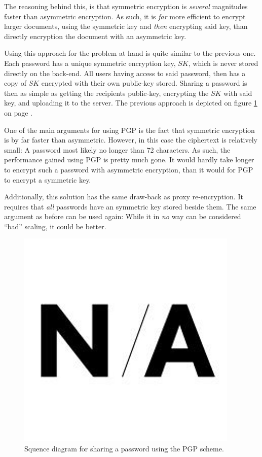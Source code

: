 				The reasoning behind this, is that symmetric encryption is \emph{several} magnitudes faster than asymmetric encryption. As such, it is \emph{far} more efficient to encrypt larger documents, using the symmetric key and \emph{then} encrypting said key, than directly encryption the document with an asymmetric key.

				Using this approach for the problem at hand is quite similar to the previous one. Each password has a unique symmetric encryption key, $SK$, which is never stored directly on the back-end. All users having access to said password, then has a copy of $SK$ encrypted with their own public-key stored. Sharing a password is then as simple as getting the recipients public-key, encrypting the $SK$ with said key, and uploading it to the server. The previous approach is depicted on figure \ref{fig:sequence:pgp} on page \pageref{fig:sequence:pgp}.

				One of the main arguments for using PGP is the fact that symmetric encryption is by far faster than asymmetric. However, in this case the ciphertext is relatively small: A password most likely no longer than 72 characters. As such, the performance gained using PGP is pretty much gone. It would hardly take longer to encrypt such a password with asymmetric encryption, than it would for PGP to encrypt a symmetric key.

				Additionally, this solution has the same draw-back as proxy re-encryption. It requires that \emph{all} passwords have an symmetric key stored beside them. The same argument as before can be used again: While it in \emph{no} way can be considered ``bad'' scaling, it could be better.

				\begin{figure}[h!]
					\centering
					\includegraphics[width=\textwidth]{figures/design/na.png}
					\caption{Squence diagram for sharing a password using the PGP scheme.}
					\label{fig:sequence:pgp}
				\end{figure}

